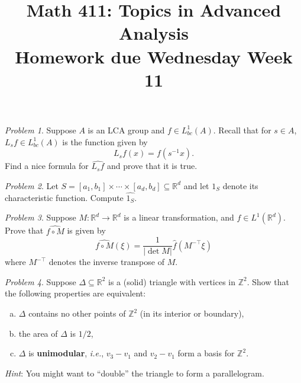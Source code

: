 \documentclass[11pt,twoside]{amsart}
\title{Math 411: Topics in Advanced Analysis\\ Homework due Wednesday Week 11}
\theoremstyle{plain}
\theoremstyle{remark}
\newtheorem{prob}{Problem}
\theoremstyle{definition}
\theoremstyle{definition}
\newcommand{\RR}{\mathbb{R}}
\newcommand{\ZZ}{\mathbb{Z}}
\begin{document}
\maketitle

\begin{prob}
Suppose $A$ is an LCA group and $f\in L^1_{bc}(A)$. Recall that for $s\in A$, $L_sf\in L^1_{bc}(A)$ is the function given by
\[
  L_sf(x) = f(s^{-1}x).
\]
Find a nice formula for $\widehat{L_sf}$ and prove that it is true.
\end{prob}

\begin{prob}
Let $S = [a_1,b_1]\times\cdots\times[a_d,b_d]\subseteq \RR^d$ and let $1_S$ denote its characteristic function. Compute $\widehat{1_S}$.
\end{prob}

\begin{prob}
Suppose $M\colon \RR^d\to \RR^d$ is a linear transformation, and $f\in L^1(\RR^d)$. Prove that $\widehat{f\circ M}$ is given by
\[
  \widehat{f\circ M}(\xi) = \frac{1}{|\det M|}\hat f(M^{-\top}\xi)
\]
where $M^{-\top}$ denotes the inverse transpose of $M$.
\end{prob}

\begin{prob}
Suppose $\Delta\subseteq \RR^2$ is a (solid) triangle with vertices in $\ZZ^2$. Show that the following properties are equivalent:
\begin{enumerate}[(a)]
\item $\Delta$ contains no other points of $\ZZ^2$ (in its interior or boundary),
\item the area of $\Delta$ is $1/2$,
\item $\Delta$ is \textbf{unimodular}, \emph{i.e.}, $v_3-v_1$ and $v_2-v_1$ form a basis for $\ZZ^2$.
\end{enumerate}
\emph{Hint}: You might want to ``double'' the triangle to form a parallelogram.
\end{prob}
\end{document}
